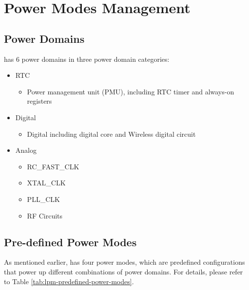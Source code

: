 \documentclass[main\_\_EN.tex]{subfiles}
\begin{document}
\section{Power Modes Management}

\subsection{Power Domains}\label{sec:lpm-power-domain}

\chipname{} has 6 power domains in three power domain categories:
\begin{itemize}
    \item RTC
        \begin{itemize}
            \item Power management unit (PMU), including RTC timer and always-on registers
        \end{itemize}
    \item Digital
        \begin{itemize}
            \item Digital including digital core and Wireless digital circuit
        \end{itemize}

    \item Analog
    \begin{itemize}
        \item RC\_FAST\_CLK
        \item XTAL\_CLK
        \item PLL\_CLK
        \item RF Circuits
    \end{itemize}
\end{itemize}


\subsection{Pre-defined Power Modes}
As mentioned earlier, \chipname{} has four power modes, which are predefined configurations that power up different combinations of power domains. For details, please refer to Table \ref{tab:lpm-predefined-power-modes}.
\end{document}
